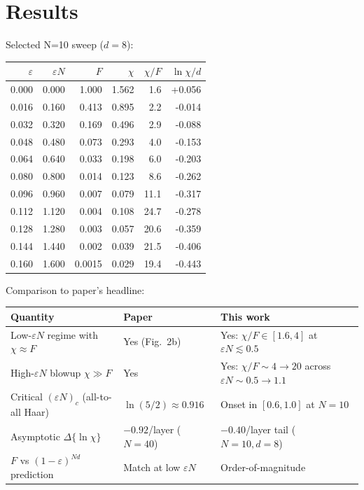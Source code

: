 \documentclass[11pt]{article}
\begin{document}
\section{Results}
Selected N=10 sweep ($d=8$):
\begin{center}
\begin{tabular}{rrrrrr}
\toprule
$\varepsilon$ & $\varepsilon N$ & $F$ & $\chi$ & $\chi/F$ & $\ln\chi/d$ \\
\midrule
0.000 & 0.000 & 1.000  & 1.562 & 1.6  & +0.056 \\
0.016 & 0.160 & 0.413  & 0.895 & 2.2  & -0.014 \\
0.032 & 0.320 & 0.169  & 0.496 & 2.9  & -0.088 \\
0.048 & 0.480 & 0.073  & 0.293 & 4.0  & -0.153 \\
0.064 & 0.640 & 0.033  & 0.198 & 6.0  & -0.203 \\
0.080 & 0.800 & 0.014  & 0.123 & 8.6  & -0.262 \\
0.096 & 0.960 & 0.007  & 0.079 & 11.1 & -0.317 \\
0.112 & 1.120 & 0.004  & 0.108 & 24.7 & -0.278 \\
0.128 & 1.280 & 0.003  & 0.057 & 20.6 & -0.359 \\
0.144 & 1.440 & 0.002  & 0.039 & 21.5 & -0.406 \\
0.160 & 1.600 & 0.0015 & 0.029 & 19.4 & -0.443 \\
\bottomrule
\end{tabular}
\end{center}

Comparison to paper's headline:

\begin{center}
\begin{tabular}{lll}
\toprule
Quantity & Paper & This work \\
\midrule
Low-$\varepsilon N$ regime with $\chi \approx F$ & Yes (Fig.~2b) & Yes: $\chi/F \in [1.6,4]$ at $\varepsilon N \lesssim 0.5$ \\
High-$\varepsilon N$ blowup $\chi \gg F$ & Yes & Yes: $\chi/F \sim 4 \to 20$ across $\varepsilon N \sim 0.5\to 1.1$ \\
Critical $(\varepsilon N)_c$ (all-to-all Haar) & $\ln(5/2) \approx 0.916$ & Onset in $[0.6,1.0]$ at $N=10$ \\
Asymptotic $\Delta\{\ln\chi\}$ & $-0.92$/layer ($N=40$) & $-0.40$/layer tail ($N=10,d=8$) \\
$F$ vs $(1-\varepsilon)^{Nd}$ prediction & Match at low $\varepsilon N$ & Order-of-magnitude \\
\bottomrule
\end{tabular}
\end{center}
\end{document}
